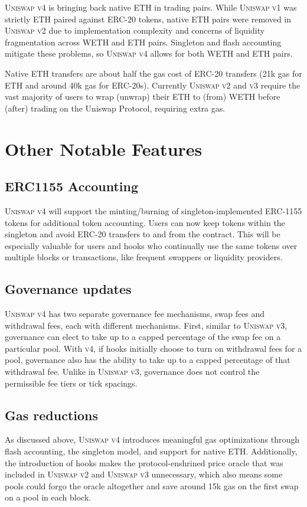 \documentclass[sigconf,nonacm,prologue,table]{acmart}
\numberwithin{equation}{section}
\theoremstyle{definition}
\theoremstyle{remark}
\begin{document}
\textsc{Uniswap v4} is bringing back native ETH in trading pairs. While \textsc{Uniswap v1} was strictly ETH paired against ERC-20 tokens, native ETH pairs were removed in \textsc{Uniswap v2} due to implementation complexity and concerns of liquidity fragmentation across WETH and ETH pairs. Singleton and flash accounting mitigate these problems, so \textsc{Uniswap v4} allows for both WETH and ETH pairs.

Native ETH transfers are about half the gas cost of ERC-20 transfers (21k gas for ETH and around 40k gas for ERC-20s). Currently \textsc{Uniswap v2} and \textsc{v3} require the vast majority of users to wrap (unwrap) their ETH to (from) WETH before (after) trading on the Uniswap Protocol, requiring extra gas. 

\section{Other Notable Features} 
\label{other}

\subsection{ERC1155 Accounting} 
\textsc{Uniswap v4} will support the minting/burning of singleton-implemented ERC-1155 tokens for additional token accounting. Users can now keep tokens within the singleton and avoid ERC-20 transfers to and from the contract. This will be especially valuable for users and hooks who continually use the same tokens over multiple blocks or transactions, like frequent swappers or liquidity providers. 

\subsection{Governance updates} 
\textsc{Uniswap v4} has two separate governance fee mechanisms, swap fees and withdrawal fees, each with different mechanisms. First, similar to \textsc{Uniswap v3}, governance can elect to take  up to a capped percentage of the swap fee on a particular pool. With \textsc{v4}, if hooks initially choose to turn on withdrawal fees for a pool, governance also has the ability to take up to a capped percentage of that withdrawal fee.
Unlike in \textsc{Uniswap v3}, governance does not control the permissible fee tiers or tick spacings.

\subsection{Gas reductions}
As discussed above, \textsc{Uniswap v4} introduces meaningful gas optimizations through flash accounting, the singleton model, and support for native ETH. Additionally, the introduction of hooks makes the protocol-enshrined price oracle that was included in \textsc{Uniswap v2} and \textsc{Uniswap v3} unnecessary, which also means some pools could forgo the oracle altogether and save around 15k gas on the first swap on a pool in each block. 
\end{document}
